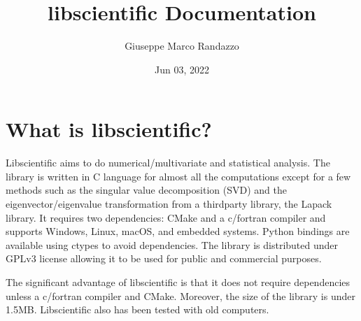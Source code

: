 \documentclass[letterpaper,10pt,english]{sphinxmanual}
\title{libscientific Documentation}
\date{Jun 03, 2022}
\author{Giuseppe Marco Randazzo}
\begin{document}
\pagestyle{empty}
\sphinxmaketitle
\pagestyle{plain}
\sphinxtableofcontents
\pagestyle{normal}
\label{\detokenize{index::doc}}


\sphinxstepscope


\chapter{What is libscientific?}
\label{\detokenize{Overview:what-is-libscientific}}\label{\detokenize{Overview::doc}}
\sphinxAtStartPar
Libscientific aims to do numerical/multivariate and statistical analysis.
The library is written in C language for almost all the computations except
for a few methods such as the singular value decomposition (SVD) and
the eigenvector/eigenvalue transformation from a third\sphinxhyphen{}party library, the Lapack library.
It requires two dependencies: CMake and a c/fortran compiler
and supports Windows, Linux, macOS, and embedded systems.
Python bindings are available using ctypes to avoid dependencies.
The library is distributed under GPLv3 license allowing it
to be used for public and commercial purposes.

\sphinxAtStartPar
The significant advantage of libscientific is that it does not require dependencies
unless a c/fortran compiler and CMake. Moreover, the size of the library is under 1.5MB.
Libscientific also has been tested with old computers.
\end{document}
